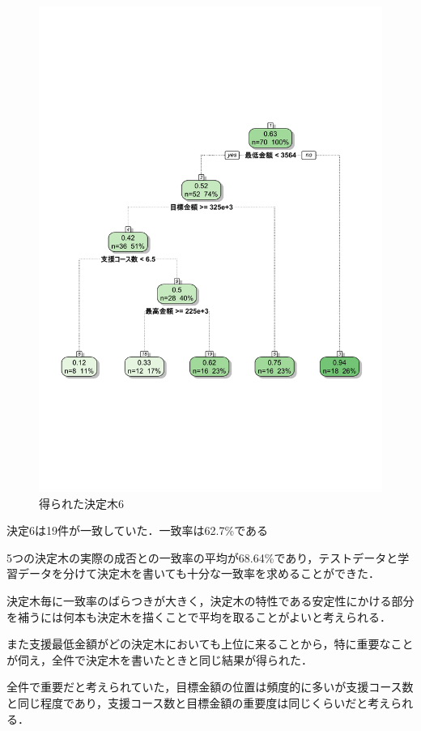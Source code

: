 \begin{figure}[H]
\centering
\includegraphics[width=13cm]{figure28.pdf}
\caption{得られた決定木6}\label{sannp}
\end{figure}

決定6は19件が一致していた．一致率は62.7\%である


5つの決定木の実際の成否との一致率の平均が68.64\%であり，テストデータと学習データを分けて決定木を書いても十分な一致率を求めることができた．

決定木毎に一致率のばらつきが大きく，決定木の特性である安定性にかける部分を補うには何本も決定木を描くことで平均を取ることがよいと考えられる．

また支援最低金額がどの決定木においても上位に来ることから，特に重要なことが伺え，全件で決定木を書いたときと同じ結果が得られた．

全件で重要だと考えられていた，目標金額の位置は頻度的に多いが支援コース数と同じ程度であり，支援コース数と目標金額の重要度は同じくらいだと考えられる．

